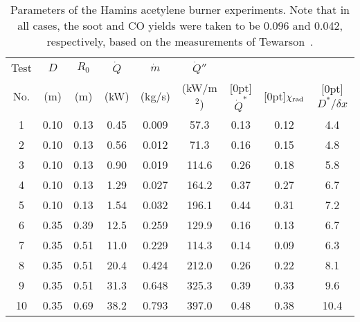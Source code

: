 \begin{table}[ht]
\caption[Parameters of the Hamins acetylene burner experiments]{Parameters of the Hamins acetylene burner experiments. Note that in all cases, the soot and CO yields were taken to be 0.096 and 0.042, respectively, based on the measurements of Tewarson~\cite{SFPE:Tewarson}.}
\begin{center}
\begin{tabular}{|c|c|c|c|c|c|c||c|c|}
\hline
Test     & $D$      & $R_0$      & $\dot{Q}$   &  $\dot{m}$            &  $\dot{Q}''$   &               &         &             \\
No.      & (m)      & (m)        & (kW)        &  (kg/s)               &  (kW/m$^2$)    & \raisebox{1.5ex}[0pt]{$\dot{Q}^*$} & \raisebox{1.5ex}[0pt]{$\chi_{\rm rad}$} & \raisebox{1.5ex}[0pt]{$D^*/\delta x$} \\ \hline \hline
1        & 0.10     & 0.13       & 0.45        &  0.009                &  57.3          & 0.13         & 0.12     & 4.4             \\ \hline
2        & 0.10     & 0.13       & 0.56        &  0.012                &  71.3          & 0.16         & 0.15     & 4.8             \\ \hline
3        & 0.10     & 0.13       & 0.90        &  0.019                &  114.6         & 0.26         & 0.18     & 5.8             \\ \hline
4        & 0.10     & 0.13       & 1.29        &  0.027                &  164.2         & 0.37         & 0.27     & 6.7             \\ \hline
5        & 0.10     & 0.13       & 1.54        &  0.032                &  196.1         & 0.44         & 0.31     & 7.2             \\ \hline
6        & 0.35     & 0.39       & 12.5        &  0.259                &  129.9         & 0.16         & 0.13     & 6.7             \\ \hline
7        & 0.35     & 0.51       & 11.0        &  0.229                &  114.3         & 0.14         & 0.09     & 6.3             \\ \hline
8        & 0.35     & 0.51       & 20.4        &  0.424                &  212.0         & 0.26         & 0.22     & 8.1             \\ \hline
9        & 0.35     & 0.51       & 31.3        &  0.648                &  325.3         & 0.39         & 0.33     & 9.6             \\ \hline
10       & 0.35     & 0.69       & 38.2        &  0.793                &  397.0         & 0.48         & 0.38     & 10.4             \\ \hline

\end{tabular}
\end{center}
\end{table}
